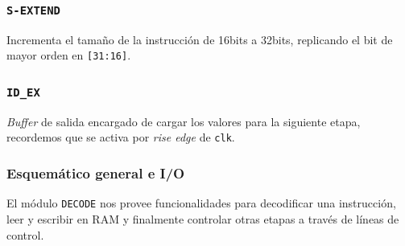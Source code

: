 \documentclass[a4paper]{article}
\begin{document}
\begin{table}[H]

\centering
{}
\caption{Control de líneas}
\label{tab:ctl-table}
\end{table}

\subsubsection{\texttt{S-EXTEND}}
Incrementa el tamaño de la instrucción de 16bits a 32bits, replicando el bit de mayor orden en \texttt{[31:16]}.

\subsubsection{\texttt{ID\_EX}}
\textit{Buffer} de salida encargado de cargar los valores para la siguiente etapa, recordemos que se activa por \textit{rise edge} de \texttt{clk}.

\subsubsection{Esquemático general e I/O}
El módulo \texttt{DECODE} nos provee funcionalidades para decodificar una instrucción, leer y escribir en RAM y finalmente controlar otras etapas a través de líneas de control.
\end{document}
